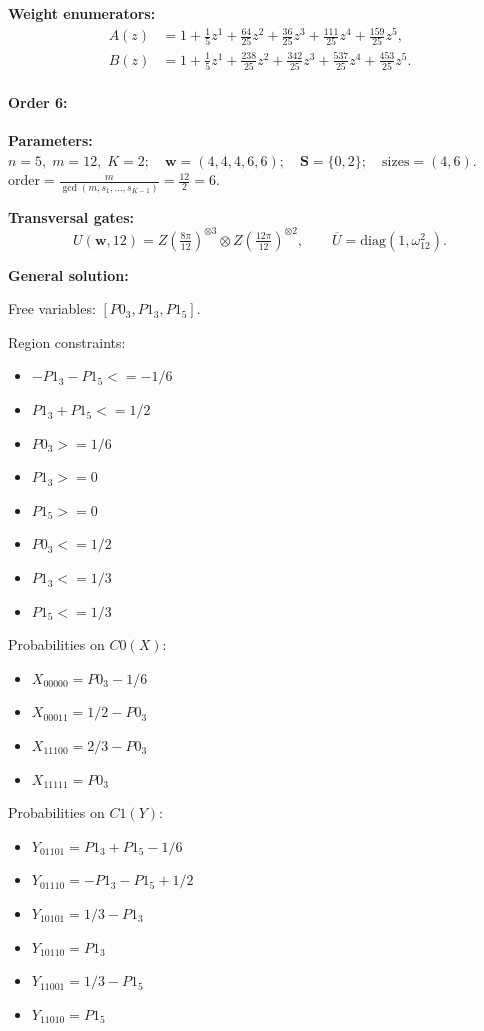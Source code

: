 \documentclass[11pt]{article}
\begin{document}
\noindent\textbf{Weight enumerators:}
\begin{align*}
A(z) &= 1 + \tfrac{1}{5}z^{1} + \tfrac{64}{25}z^{2} + \tfrac{36}{25}z^{3} + \tfrac{111}{25}z^{4} + \tfrac{159}{25}z^{5},\\[2pt]
B(z) &= 1 + \tfrac{1}{5}z^{1} + \tfrac{238}{25}z^{2} + \tfrac{342}{25}z^{3} + \tfrac{537}{25}z^{4} + \tfrac{453}{25}z^{5}.
\end{align*}

\paragraph{\textbf{Order 6:}}
\noindent\textbf{Parameters:} $n=5,\; m=12,\; K=2;\quad \mathbf w=(4, 4, 4, 6, 6);\quad \mathbf S=\{0, 2\};\quad \text{sizes}=\left(4, 6\right).$ $\displaystyle \text{order}=\frac{m}{\gcd(m,s_1,\dots,s_{K-1})}=\frac{12}{2}=6.$

\noindent\textbf{Transversal gates:}
\[
    U(\mathbf w,12)=Z \left(\tfrac{8\pi}{12}\right)^{\otimes3} \otimes Z \left(\tfrac{12\pi}{12}\right)^{\otimes2},\qquad
    \overline U=\mathrm{diag}(1,\omega_{12}^{2}).
\]

\noindent\textbf{General solution:}

Free variables: $[P0_3, P1_3, P1_5]$.

Region constraints:
\begin{itemize}
    \item $-P1_3 - P1_5 <= -1/6$
    \item $P1_3 + P1_5 <= 1/2$
    \item $P0_3 >= 1/6$
    \item $P1_3 >= 0$
    \item $P1_5 >= 0$
    \item $P0_3 <= 1/2$
    \item $P1_3 <= 1/3$
    \item $P1_5 <= 1/3$
\end{itemize}

Probabilities on $C0 (X)$:
\begin{itemize}
    \item $X_{00000} = P0_3 - 1/6$
    \item $X_{00011} = 1/2 - P0_3$
    \item $X_{11100} = 2/3 - P0_3$
    \item $X_{11111} = P0_3$
\end{itemize}

Probabilities on $C1 (Y)$:
\begin{itemize}
    \item $Y_{01101} = P1_3 + P1_5 - 1/6$
    \item $Y_{01110} = -P1_3 - P1_5 + 1/2$
    \item $Y_{10101} = 1/3 - P1_3$
    \item $Y_{10110} = P1_3$
    \item $Y_{11001} = 1/3 - P1_5$
    \item $Y_{11010} = P1_5$
\end{itemize}
\end{document}

